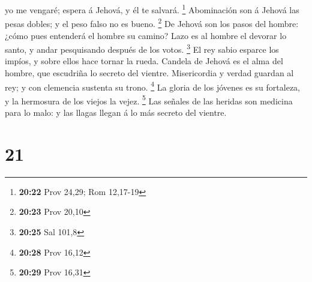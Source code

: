 yo me vengaré; espera á Jehová, y él te salvará. \footnote{\textbf{20:22}
  Prov 24,29; Rom 12,17-19}  Abominación son á Jehová las
pesas dobles; y el peso falso no es bueno. \footnote{\textbf{20:23} Prov
  20,10}  De Jehová son los pasos del hombre: ¿cómo pues
entenderá el hombre su camino?  Lazo es al hombre el
devorar lo santo, y andar pesquisando después de los votos. \footnote{\textbf{20:25}
  Sal 101,8}  El rey sabio esparce los impíos, y sobre
ellos hace tornar la rueda.  Candela de Jehová es el alma
del hombre, que escudriña lo secreto del vientre. 
Misericordia y verdad guardan al rey; y con clemencia sustenta su trono.
\footnote{\textbf{20:28} Prov 16,12}  La gloria de los
jóvenes es su fortaleza, y la hermosura de los viejos la vejez.
\footnote{\textbf{20:29} Prov 16,31}  Las señales de las
heridas son medicina para lo malo: y las llagas llegan á lo más secreto
del vientre.

\hypertarget{section-20}{%
\section{21}\label{section-20}}

